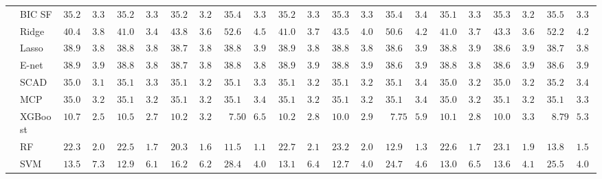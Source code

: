 \begin{tabular}{p{0.2cm}p{1cm}|p{0.6cm}p{0.6cm}|p{0.6cm}p{0.6cm}p{0.6cm}p{0.6cm}p{0.6cm}p{0.6cm}|p{0.6cm}p{0.6cm}p{0.6cm}p{0.6cm}p{0.6cm}p{0.6cm}|p{0.6cm}p{0.6cm}p{0.6cm}p{0.6cm}p{0.6cm}p{0.6cm}}
 & BIC SF  & $35.27$ & $3.31$ & $35.26$ & $3.35$ & $35.29$ & $3.26$ & $35.49$ & $3.32$ & $35.25$ & $3.31$ & $35.34$ & $3.32$ & $35.45$ & $3.40$ & $35.17$ & $3.33$ & $35.30$ & $3.29$ & $35.50$ & $3.38$ \\
 & Ridge  & $40.44$ & $3.81$ & $41.01$ & $3.48$ & $43.83$ & $3.63$ & $52.60$ & $4.57$ & $41.06$ & $3.78$ & $43.57$ & $4.09$ & $50.65$ & $4.23$ & $41.08$ & $3.72$ & $43.35$ & $3.64$ & $52.23$ & $4.26$ \\
 & Lasso  & $38.96$ & $3.89$ & $38.81$ & $3.87$ & $38.79$ & $3.85$ & $38.89$ & $3.93$ & $38.96$ & $3.89$ & $38.86$ & $3.89$ & $38.66$ & $3.97$ & $38.82$ & $3.92$ & $38.68$ & $3.96$ & $38.72$ & $3.88$ \\
 & E-net  & $38.99$ & $3.94$ & $38.82$ & $3.89$ & $38.76$ & $3.87$ & $38.82$ & $3.89$ & $38.94$ & $3.95$ & $38.87$ & $3.91$ & $38.63$ & $3.93$ & $38.83$ & $3.89$ & $38.66$ & $3.97$ & $38.64$ & $3.90$ \\
 & SCAD  & $35.00$ & $3.18$ & $35.10$ & $3.30$ & $35.12$ & $3.21$ & $35.10$ & $3.35$ & $35.16$ & $3.21$ & $35.10$ & $3.23$ & $35.10$ & $3.40$ & $35.03$ & $3.26$ & $35.08$ & $3.20$ & $35.23$ & $3.41$ \\
 & MCP  & $35.07$ & $3.21$ & $35.14$ & $3.28$ & $35.11$ & $3.21$ & $35.15$ & $3.40$ & $35.17$ & $3.26$ & $35.10$ & $3.21$ & $35.11$ & $3.41$ & $35.04$ & $3.27$ & $35.10$ & $3.21$ & $35.15$ & $3.38$ \\
 & XGBoost  & $10.72$ & $2.51$ & $10.55$ & $2.78$ & $10.27$ & $3.22$ & $\phantom{0}7.50$ & $6.52$ & $10.24$ & $2.80$ & $10.08$ & $2.98$ & $\phantom{0}7.75$ & $5.92$ & $10.13$ & $2.88$ & $10.01$ & $3.38$ & $\phantom{0}8.79$ & $5.38$ \\
 & RF  & $22.38$ & $2.08$ & $22.55$ & $1.79$ & $20.35$ & $1.66$ & $11.55$ & $1.10$ & $22.70$ & $2.18$ & $23.22$ & $2.04$ & $12.96$ & $1.39$ & $22.69$ & $1.73$ & $23.17$ & $1.96$ & $13.89$ & $1.53$ \\
 & SVM  & $13.54$ & $7.36$ & $12.97$ & $6.14$ & $16.26$ & $6.20$ & $28.47$ & $4.00$ & $13.15$ & $6.46$ & $12.78$ & $4.08$ & $24.75$ & $4.67$ & $13.05$ & $6.56$ & $13.65$ & $4.10$ & $25.58$ & $4.09$ \\
\hline 
\end{tabular}

